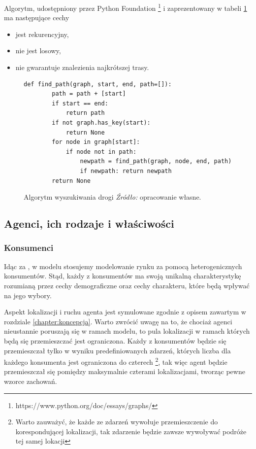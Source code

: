 \documentclass[polish, twoside, 12pt, a4paper]{article}
\theoremstyle{definition}
\theoremstyle{plain}
\theoremstyle{remark}
\begin{document}
Algorytm, udostępniony przez Python Foundation \footnote{https://www.python.org/doc/essays/graphs/} i zaprezentowany w tabeli \ref{fig:wayfinding} ma następujące cechy
	\begin{itemize}
		\item jest rekurencyjny,
		\item nie jest losowy,
		\item nie gwarantuje znalezienia najkrótszej trasy.
	\end{itemize}


\begin{figure}[hbt]
  \centering
\begin{lstlisting}[frame=single, label=szukaniedrogi]  
    def find_path(graph, start, end, path=[]):
        path = path + [start]
        if start == end:
            return path
        if not graph.has_key(start):
            return None
        for node in graph[start]:
            if node not in path:
                newpath = find_path(graph, node, end, path)
                if newpath: return newpath
        return None
\end{lstlisting}
  \captionsetup{margin=10pt,font=small,labelfont=bf,width=.8\textwidth}
  \caption[Algorytm wyszukiwania drogi]{Algorytm wyszukiwania drogi \textit{Źródło:} opracowanie własne.}\label{fig:wayfinding}
\end{figure}


\subsection{Agenci, ich rodzaje i właściwości}
\subsubsection{Konsumenci} \label{chapter:konsumenci}

Idąc za \cite{Kaminski2012}, w modelu stosujemy modelowanie rynku za pomocą heterogenicznych konsumentów. Stąd, każdy z konsumentów ma swoją unikalną charakterystykę rozumianą przez cechy demograficzne oraz cechy charakteru, które będą wpływać na jego wybory. 

Aspekt lokalizacji i ruchu agenta jest symulowane zgodnie z opisem zawartym w rozdziale \ref{chapter:koncepcja}. Warto zwrócić uwagę na to, że chociaż agenci nieustannie poruszają się w ramach modelu, to pula lokalizacji w ramach których będą się przemieszczać jest ograniczona. Każdy z konsumentów będzie się przemieszczał tylko w wyniku predefiniowanych zdarzeń, których liczba dla każdego konsumenta jest ograniczona do czterech \footnote{Warto zauważyć, że każde ze zdarzeń wywołuje przemieszczenie do korespondującej lokalizacji, tak zdarzenie będzie zawsze wywoływać podróże tej samej lokacji}, tak więc agent będzie przemieszczał się pomiędzy maksymalnie czterami lokalizacjami, tworząc pewne wzorce zachowań. 
\end{document}
